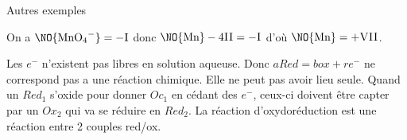     \begin{example}{Autres exemples}{}
        \begin{enumerate}
            \itt On a $\NO{{\text{Mn}\text O_4}^-} = -\textsc{I}$ donc $\NO{\text{Mn}} -4\textsc{II} = -\textsc{I}$ d'où $\NO{\text{Mn}} = +\textsc{VII}$.
        \end{enumerate}
    \end{example}

    Les $e^-$ n'existent pas libres en solution aqueuse.
    Donc $a Red = b ox + re^-$ ne correspond pas a une réaction chimique. Elle ne peut pas avoir lieu seule. Quand un $Red_1$ s'oxide pour donner $Oc_1$ en cédant des $e^-$, ceux-ci doivent être capter par un $Ox_2$ qui va se réduire en $Red_2$. La réaction d'oxydoréduction est une réaction entre 2 couples red/ox.

